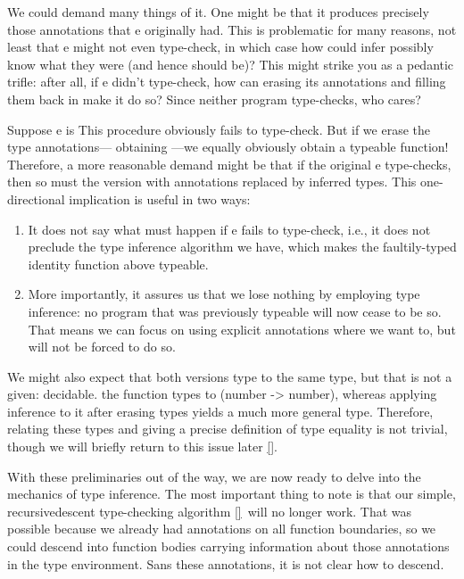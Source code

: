 We could demand many things of it. One might be that it produces precisely those
annotations that e originally had. This is problematic for many reasons, not least that e
might not even type-check, in which case how could infer possibly know what they
were (and hence should be)? This might strike you as a pedantic trifle: after all, if e
didn’t type-check, how can erasing its annotations and filling them back in make it do
so? Since neither program type-checks, who cares?


Suppose e is
This procedure obviously fails to type-check. But if we erase the type annotations—
obtaining
—we equally obviously obtain a typeable function! Therefore, a more reasonable demand
might be that if the original e type-checks, then so must the version with annotations
replaced by inferred types. This one-directional implication is useful in two
ways:
\begin{enumerate}
  \item 
It does not say what must happen if e fails to type-check, i.e., it does not preclude
the type inference algorithm we have, which makes the faultily-typed identity
function above typeable.
  \item 
More importantly, it assures us that we lose nothing by employing type inference:
no program that was previously typeable will now cease to be so. That means we
can focus on using explicit annotations where we want to, but will not be forced
to do so.
\end{enumerate}
We might also expect that both versions type to the same type, but that is not a given: decidable.
the function
types to (number -> number), whereas applying inference to it after erasing types
yields a much more general type. Therefore, relating these types and giving a precise
definition of type equality is not trivial, though we will briefly return to this issue later
\ref{}.

With these preliminaries out of the way, we are now ready to delve into the mechanics
of type inference. The most important thing to note is that our simple, recursivedescent
type-checking algorithm \ref{}\ will no longer work. That was possible because
we already had annotations on all function boundaries, so we could descend into function
bodies carrying information about those annotations in the type environment. Sans
these annotations, it is not clear how to descend.

